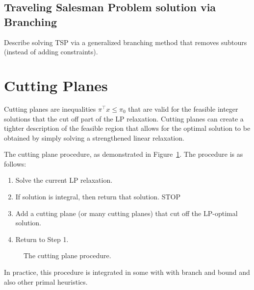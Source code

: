 
\subsection{Traveling Salesman Problem solution via Branching}


\begin{todo}
Describe solving TSP via a generalized branching method that removes subtours (instead of adding constraints).
\end{todo}




\section{Cutting Planes}
Cutting planes are inequalities $\pi^\top x \leq \pi_0$ that are valid for the feasible integer solutions that the cut off part of the LP relaxation.  Cutting planes can create a tighter description of the feasible region that allows for the optimal solution to be obtained by simply solving a strengthened linear relaxation. 

The cutting plane procedure, as demonstrated in Figure~\ref{fig:cutting-plane-procudure}.  The procedure is as follows:
\begin{enumerate}
\item Solve the current LP relaxation.
\item If solution is integral, then return that solution.  STOP
\item Add a cutting plane (or many cutting planes) that cut off the LP-optimal solution.
\item Return to Step 1.
\end{enumerate}

\begin{figure}[H]
\caption{The cutting plane procedure.}
\label{fig:cutting-plane-procudure}
\end{figure}

In practice, this procedure is integrated in some with with branch and bound and also other primal heuristics.

